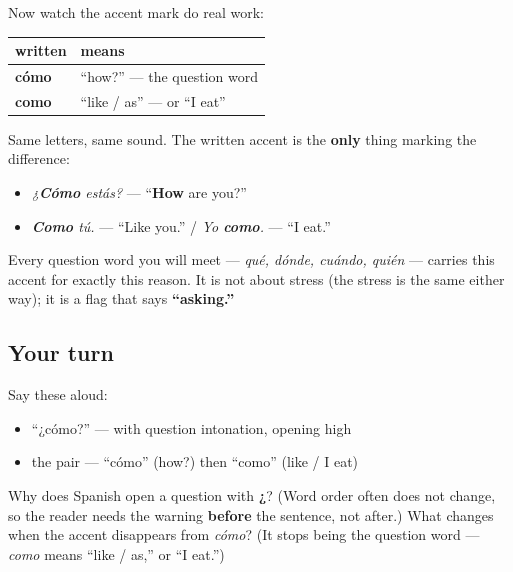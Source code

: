 \begin{grammarlens}[title={Grammar Lens: the accent that marks a question}]
Now watch the accent mark do real work:

\noindent
\begin{tabularx}{\linewidth}{@{}>{\raggedright\arraybackslash}X>{\raggedright\arraybackslash}X@{}}
\toprule
\textbf{written} & \textbf{means} \\
\midrule
\textbf{cómo} & \textquotedblleft{}how?\textquotedblright{} — the question word \\
\textbf{como} & \textquotedblleft{}like / as\textquotedblright{} — or \textquotedblleft{}I eat\textquotedblright{} \\
\bottomrule
\end{tabularx}

Same letters, same sound. The written accent is the \textbf{only} thing marking the difference:

\begin{itemize}
\raggedright
  \item \emph{¿\textbf{Cómo} estás?} — \textquotedblleft{}\textbf{How} are you?\textquotedblright{}
  \item \emph{\textbf{Como} tú.} — \textquotedblleft{}Like you.\textquotedblright{} / \emph{Yo \textbf{como}.} — \textquotedblleft{}I eat.\textquotedblright{}
\end{itemize}

Every question word you will meet — \emph{qué, dónde, cuándo, quién} — carries this accent for exactly this reason. It is not about stress (the stress is the same either way); it is a flag that says \textbf{\textquotedblleft{}asking.\textquotedblright{}}
\end{grammarlens}

\subsection*{Your turn}
Say these aloud:

\begin{itemize}
\raggedright
  \item \textquotedblleft{}¿cómo?\textquotedblright{} — with question intonation, opening high
  \item the pair — \textquotedblleft{}cómo\textquotedblright{} (how?) then \textquotedblleft{}como\textquotedblright{} (like / I eat)
\end{itemize}

\begin{tcolorbox}[breakable,colback=teal!4,colframe=teal!35!black,title={Before you move on}]
Why does Spanish open a question with \textbf{¿}? (Word order often does not change, so the reader needs the warning \textbf{before} the sentence, not after.) What changes when the accent disappears from \emph{cómo}? (It stops being the question word — \emph{como} means \textquotedblleft{}like / as,\textquotedblright{} or \textquotedblleft{}I eat.\textquotedblright{})
\end{tcolorbox}

